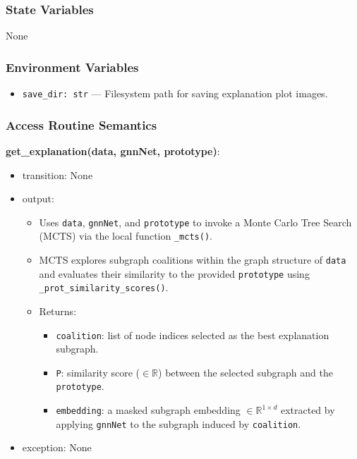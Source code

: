 \documentclass[12pt, titlepage]{article}
\begin{document}
\subsubsection{State Variables}
None

\subsubsection{Environment Variables}
\begin{itemize}
  \item \texttt{save\_dir: str} — Filesystem path for saving explanation plot images.
\end{itemize}

\subsubsection{Access Routine Semantics}

\noindent \textbf{get\_explanation(data, gnnNet, prototype)}:
\begin{itemize}
  \item transition: None
  \item output:
  \begin{itemize}
    \item Uses \texttt{data}, \texttt{gnnNet}, and \texttt{prototype} to invoke a Monte Carlo Tree Search (MCTS) via the local function \texttt{\_mcts()}.
    \item MCTS explores subgraph coalitions within the graph structure of \texttt{data} and evaluates their similarity to the provided \texttt{prototype} using \texttt{\_prot\_similarity\_scores()}.
    \item Returns:
    \begin{itemize}
      \item \texttt{coalition}: list of node indices selected as the best explanation subgraph.
      \item \texttt{P}: similarity score (\(\in \mathbb{R}\)) between the selected subgraph and the \texttt{prototype}.
      \item \texttt{embedding}: a masked subgraph embedding \(\in \mathbb{R}^{1 \times d}\) extracted by applying \texttt{gnnNet} to the subgraph induced by \texttt{coalition}.
    \end{itemize}
  \end{itemize}
  \item exception: None
\end{itemize}
\end{document}
